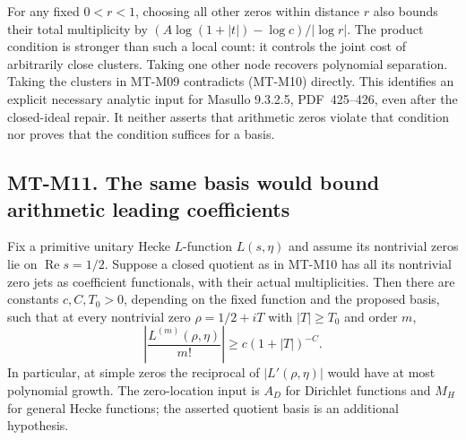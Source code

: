 For any fixed $0<r<1$, choosing all other zeros within distance
$r$ also bounds their total multiplicity by
$(A\log(1+|t|)-\log c)/|\log r|$.
The product condition is stronger than such a local count:
it controls the joint cost of arbitrarily close clusters.
Taking one other node recovers polynomial separation.
Taking the clusters in MT-M09 contradicts (MT-M10) directly.
This identifies an explicit necessary analytic input for
Masullo 9.3.2.5, PDF~425--426, even after the closed-ideal repair.
It neither asserts that arithmetic zeros violate that condition
nor proves that the condition suffices for a basis.

\subsection*{MT-M11. The same basis would bound arithmetic leading coefficients}
Fix a primitive unitary Hecke $L$-function $L(s,\eta)$ and assume
its nontrivial zeros lie on $\operatorname{Re}s=1/2$.
Suppose a closed quotient as in MT-M10 has all its nontrivial
zero jets as coefficient functionals, with their actual
multiplicities. Then there are constants $c,C,T_0>0$, depending
on the fixed function and the proposed basis, such that at every
nontrivial zero $\rho=1/2+iT$ with $|T|\ge T_0$ and order $m$,
\[
               \left|\frac{L^{(m)}(\rho,\eta)}{m!}\right|
                        \ge c(1+|T|)^{-C}.             \tag{MT-M11}
\]
In particular, at simple zeros the reciprocal of $|L'(\rho,\eta)|$
would have at most polynomial growth. The zero-location input is
$A_D$ for Dirichlet functions and $M_H$ for general Hecke functions;
the asserted quotient basis is an additional hypothesis.

